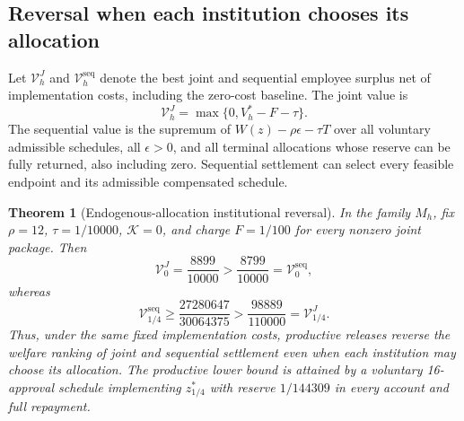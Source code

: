 \documentclass[ecta,draft]{econsocart}
\newtheorem{theorem}{Theorem}
\theoremstyle{definition}
\theoremstyle{definition}
\begin{document}
\subsection{Reversal when each institution chooses its allocation}
\label{sec:endogenousreversal}

Let $\mathcal V_h^J$ and $\mathcal V_h^{\mathrm{seq}}$ denote the best joint
and sequential employee surplus net of implementation costs, including the
zero-cost baseline. The joint value is
\[
 \mathcal V_h^J=\max\{0,V_h^*-F-\tau\}.
\]
The sequential value is the supremum of
$W(z)-\rho\epsilon-\tau T$ over all voluntary admissible schedules, all
$\epsilon>0$, and all terminal allocations whose reserve can be fully returned,
also including zero. Sequential settlement can select every feasible endpoint and its
admissible compensated schedule.

\begin{theorem}[Endogenous-allocation institutional reversal]
\label{thm:endogenousreversal}
In the family $M_h$, fix $\rho=12$, $\tau=1/10000$, $\mathcal K=0$, and charge
$F=1/100$ for every nonzero joint package. Then
\[
 \mathcal V_0^J=\frac{8899}{10000}
 >\frac{8799}{10000}=\mathcal V_0^{\mathrm{seq}},
\]
whereas
\[
 \mathcal V_{1/4}^{\mathrm{seq}}
 \geq\frac{27280647}{30064375}
 >\frac{98889}{110000}=\mathcal V_{1/4}^J.
\]
Thus, under the same fixed implementation costs, productive releases reverse
the welfare ranking of joint and sequential settlement even when each
institution may choose its allocation. The productive lower bound is attained
by a voluntary 16-approval schedule implementing $z_{1/4}^*$ with reserve
$1/144309$ in every account and full repayment.
\end{theorem}
\end{document}

